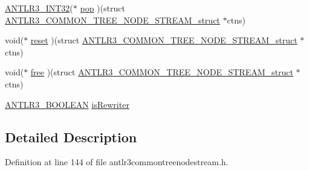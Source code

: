\begin{DoxyCompactItemize}
\hyperlink{antlr3defs_8h_a6faef5c4687f8eb633d2aefea93973ca}{A\-N\-T\-L\-R3\-\_\-\-I\-N\-T32}($\ast$ \hyperlink{struct_a_n_t_l_r3___c_o_m_m_o_n___t_r_e_e___n_o_d_e___s_t_r_e_a_m__struct_aff0d149fb54809646fe31a7530b7c0b6}{pop} )(struct \hyperlink{struct_a_n_t_l_r3___c_o_m_m_o_n___t_r_e_e___n_o_d_e___s_t_r_e_a_m__struct}{A\-N\-T\-L\-R3\-\_\-\-C\-O\-M\-M\-O\-N\-\_\-\-T\-R\-E\-E\-\_\-\-N\-O\-D\-E\-\_\-\-S\-T\-R\-E\-A\-M\-\_\-struct} $\ast$ctns)
\item 
void($\ast$ \hyperlink{struct_a_n_t_l_r3___c_o_m_m_o_n___t_r_e_e___n_o_d_e___s_t_r_e_a_m__struct_a22ce819ea1f5facbb49fb284acd2822f}{reset} )(struct \hyperlink{struct_a_n_t_l_r3___c_o_m_m_o_n___t_r_e_e___n_o_d_e___s_t_r_e_a_m__struct}{A\-N\-T\-L\-R3\-\_\-\-C\-O\-M\-M\-O\-N\-\_\-\-T\-R\-E\-E\-\_\-\-N\-O\-D\-E\-\_\-\-S\-T\-R\-E\-A\-M\-\_\-struct} $\ast$ctns)
\item 
void($\ast$ \hyperlink{struct_a_n_t_l_r3___c_o_m_m_o_n___t_r_e_e___n_o_d_e___s_t_r_e_a_m__struct_aebf4caa6b0e7bbb320948665c72aa328}{free} )(struct \hyperlink{struct_a_n_t_l_r3___c_o_m_m_o_n___t_r_e_e___n_o_d_e___s_t_r_e_a_m__struct}{A\-N\-T\-L\-R3\-\_\-\-C\-O\-M\-M\-O\-N\-\_\-\-T\-R\-E\-E\-\_\-\-N\-O\-D\-E\-\_\-\-S\-T\-R\-E\-A\-M\-\_\-struct} $\ast$ctns)
\item 
\hyperlink{antlr3defs_8h_a5b33dccbba3b7212539695e21df4079b}{A\-N\-T\-L\-R3\-\_\-\-B\-O\-O\-L\-E\-A\-N} \hyperlink{struct_a_n_t_l_r3___c_o_m_m_o_n___t_r_e_e___n_o_d_e___s_t_r_e_a_m__struct_abab9e476b6e593a400f6540931e00c19}{is\-Rewriter}
\end{DoxyCompactItemize}


\subsection{Detailed Description}


Definition at line 144 of file antlr3commontreenodestream.\-h.



